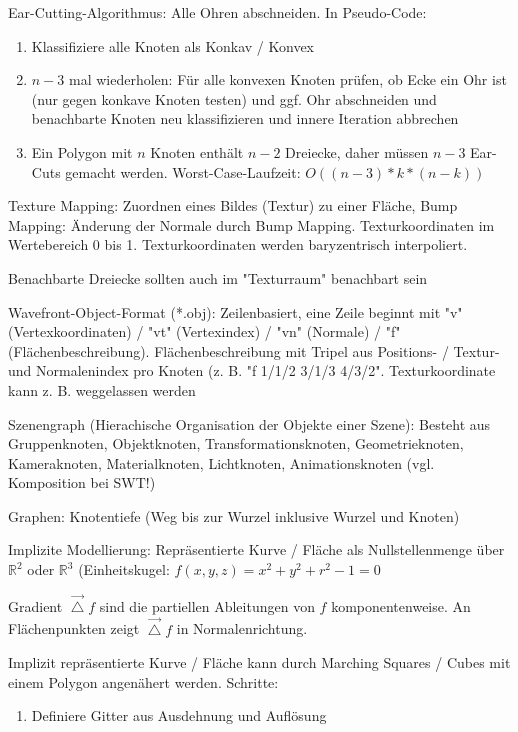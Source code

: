\documentclass[12pt,landscape]{article}
\begin{document}
\begin{multicols}{3}
\begin{compactitem}
\item Ear-Cutting-Algorithmus: Alle Ohren abschneiden. In Pseudo-Code:
\begin{enumerate}
\item Klassifiziere alle Knoten als Konkav / Konvex
\item $n - 3$ mal wiederholen: Für alle konvexen Knoten prüfen, ob Ecke ein Ohr ist (nur gegen konkave Knoten testen) und ggf. Ohr abschneiden und benachbarte Knoten neu klassifizieren und innere Iteration abbrechen
\item Ein Polygon mit $n$ Knoten enthält $n-2$ Dreiecke, daher müssen $n - 3$ Ear-Cuts gemacht werden. Worst-Case-Laufzeit: $O((n-3)*k*(n-k))$
\end{enumerate}
\item Texture Mapping: Zuordnen eines Bildes (Textur) zu einer Fläche, Bump Mapping: Änderung der Normale durch Bump Mapping. Texturkoordinaten im Wertebereich 0 bis 1. Texturkoordinaten werden baryzentrisch interpoliert.
\item Benachbarte Dreiecke sollten auch im "Texturraum" benachbart sein
\item Wavefront-Object-Format (*.obj): Zeilenbasiert, eine Zeile beginnt mit "v" (Vertexkoordinaten) / "vt" (Vertexindex) / "vn" (Normale) / "f" (Flächenbeschreibung). Flächenbeschreibung mit Tripel aus Positions- / Textur- und Normalenindex pro Knoten (z. B. "f 1/1/2 3/1/3 4/3/2". Texturkoordinate kann z. B. weggelassen werden
\item Szenengraph (Hierachische Organisation der Objekte einer Szene): Besteht aus Gruppenknoten, Objektknoten, Transformationsknoten, Geometrieknoten, Kameraknoten, Materialknoten, Lichtknoten, Animationsknoten (vgl. Komposition bei SWT!)
\item Graphen: Knotentiefe (Weg bis zur Wurzel inklusive Wurzel und Knoten)
\item Implizite Modellierung: Repräsentierte Kurve / Fläche als Nullstellenmenge über $\mathbb{R}^2$ oder $\mathbb{R}^3$ (Einheitskugel: $f(x,y,z) = x^2 + y^2 + r^2 - 1 = 0$
\item Gradient $\vec{\bigtriangleup} f$ sind die partiellen Ableitungen von $f$ komponentenweise. An Flächenpunkten zeigt $\vec{\bigtriangleup} f$ in Normalenrichtung.
\item Implizit repräsentierte Kurve / Fläche kann durch Marching Squares / Cubes mit einem Polygon angenähert werden. Schritte:
\begin{enumerate}
\item Definiere Gitter aus Ausdehnung und Auflösung

\end{enumerate}
\end{compactitem}
\end{multicols}
\end{document}
